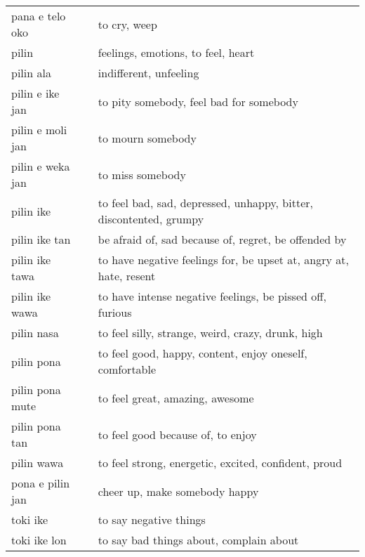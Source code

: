 \begin{supertabular}{p{4,5cm}|ll}
    pana e telo oko             &  & to cry, weep                                                       \\
    pilin                       &  & feelings, emotions, to feel, heart                                 \\
    pilin ala                   &  & indifferent, unfeeling                                             \\
    pilin e ike jan             &  & to pity somebody, feel bad for somebody                            \\
    pilin e moli jan            &  & to mourn somebody                                                  \\
    pilin e weka jan            &  & to miss somebody                                                   \\
    pilin ike                   &  & to feel bad, sad, depressed, unhappy, bitter, discontented, grumpy \\
    pilin ike tan               &  & be afraid of, sad because of, regret, be offended by               \\
    pilin ike tawa              &  & to have negative feelings for, be upset at, angry at, hate, resent \\
    pilin ike wawa              &  & to have intense negative feelings, be pissed off, furious          \\
    pilin nasa                  &  & to feel silly, strange, weird, crazy, drunk, high                  \\
    pilin pona                  &  & to feel good, happy, content, enjoy oneself, comfortable           \\
    pilin pona mute             &  & to feel great, amazing, awesome                                    \\
    pilin pona tan              &  & to feel good because of, to enjoy                                  \\
    pilin wawa                  &  & to feel strong, energetic, excited, confident, proud               \\
    pona e pilin jan            &  & cheer up, make somebody happy                                      \\
    toki ike                    &  & to say negative things                                             \\
    toki ike lon                &  & to say bad things about, complain about                            \\

\end{supertabular}
